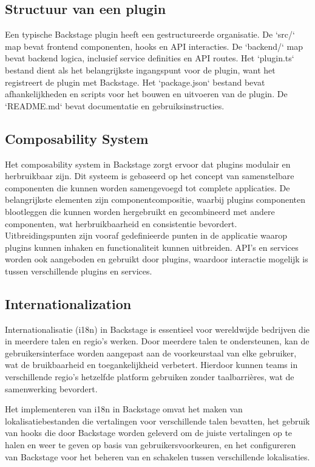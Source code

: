 \subsection{Structuur van een plugin}

Een typische Backstage plugin heeft een gestructureerde organisatie. De `src/` map bevat frontend componenten, hooks en API interacties. De `backend/` map bevat backend logica, inclusief service definities en API routes. Het `plugin.ts` bestand dient als het belangrijkste ingangspunt voor de plugin, want het registreert de plugin met Backstage. Het `package.json` bestand bevat afhankelijkheden en scripts voor het bouwen en uitvoeren van de plugin. De `README.md` bevat documentatie en gebruiksinstructies.

\subsection{Composability System}

Het composability system in Backstage zorgt ervoor dat plugins modulair en herbruikbaar zijn. Dit systeem is gebaseerd op het concept van samenstelbare componenten die kunnen worden samengevoegd tot complete applicaties. De belangrijkste elementen zijn componentcompositie, waarbij plugins componenten blootleggen die kunnen worden hergebruikt en gecombineerd met andere componenten, wat herbruikbaarheid en consistentie bevordert. Uitbreidingspunten zijn vooraf gedefinieerde punten in de applicatie waarop plugins kunnen inhaken en functionaliteit kunnen uitbreiden. API's en services worden ook aangeboden en gebruikt door plugins, waardoor interactie mogelijk is tussen verschillende plugins en services.

\subsection{Internationalization}

Internationalisatie (i18n) in Backstage is essentieel voor wereldwijde bedrijven die in meerdere talen en regio's werken. Door meerdere talen te ondersteunen, kan de gebruikersinterface worden aangepast aan de voorkeurstaal van elke gebruiker, wat de bruikbaarheid en toegankelijkheid verbetert. Hierdoor kunnen teams in verschillende regio's hetzelfde platform gebruiken zonder taalbarrières, wat de samenwerking bevordert. 

Het implementeren van i18n in Backstage omvat het maken van lokalisatiebestanden die vertalingen voor verschillende talen bevatten, het gebruik van hooks die door Backstage worden geleverd om de juiste vertalingen op te halen en weer te geven op basis van gebruikersvoorkeuren, en het configureren van Backstage voor het beheren van en schakelen tussen verschillende lokalisaties.

